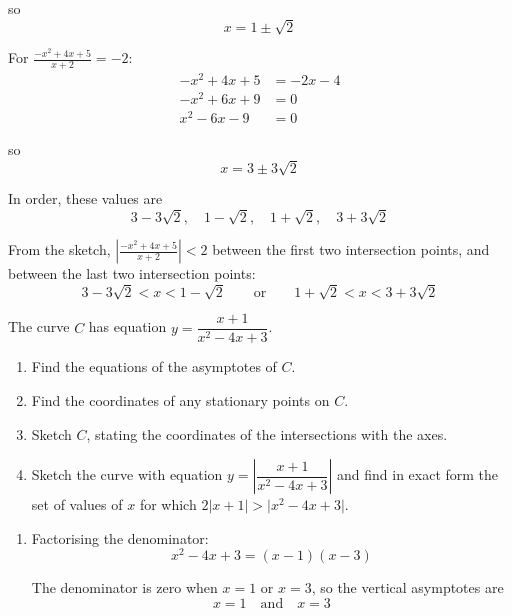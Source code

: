 \documentclass[leqno]{article}
\begin{document}
\begin{enumerate}[
  label=\textbf{\arabic*.},
  leftmargin=*,
  topsep=0pt,
  partopsep=0pt,
  parsep=0pt
]
\begin{djsSolution}
\begin{enumerate}[label=\textbf{(\alph*)}]
  so
  \[
  x=1\pm\sqrt2
  \]

  For $\frac{-x^2+4x+5}{x+2}=-2$:
  \begin{align*}
  -x^2+4x+5&=-2x-4\\
  -x^2+6x+9&=0\\
  x^2-6x-9&=0
  \end{align*}

  so
  \[
  x=3\pm 3\sqrt2
  \]

  In order, these values are
  \[
  3-3\sqrt2,\quad 1-\sqrt2,\quad 1+\sqrt2,\quad 3+3\sqrt2
  \]

  From the sketch, $\left| \frac{-x^2+4x+5}{x+2} \right|<2$ between the first two intersection points, and between the last two intersection points:
  \[
  3-3\sqrt2<x<1-\sqrt2
  \qquad\text{or}\qquad
  1+\sqrt2<x<3+3\sqrt2
  \]
\end{enumerate}
\end{djsSolution}


\newpage

\questionitem

The curve $C$ has equation $y = \dfrac{x+1}{x^2-4x+3}$. \\
\begin{enumerate}[label=\textbf{(\alph*)}]
  \item Find the equations of the asymptotes of $C$.  \\
  \item Find the coordinates of any stationary points on $C$.  \\
  \item Sketch $C$, stating the coordinates of the intersections with the axes.  \\
  \item Sketch the curve with equation $y = \left|\dfrac{x+1}{x^2-4x+3}\right|$ and find in exact form the set of values of $x$ for which $2\lvert x+1\rvert > \lvert x^2-4x+3\rvert$.  \\
\end{enumerate}

\vspace*{10pt}

\begin{djsSolution}
\begin{enumerate}[label=\textbf{(\alph*)}]
  \item
  Factorising the denominator:
  \[
  x^2-4x+3=(x-1)(x-3)
  \]

  The denominator is zero when \(x=1\) or \(x=3\), so the vertical asymptotes are
  \[
  x=1 \quad \text{and} \quad x=3
  \]


\end{enumerate}
\end{djsSolution}
\end{enumerate}
\end{document}
